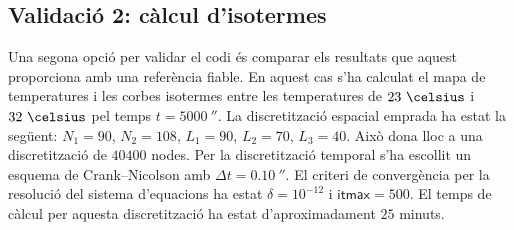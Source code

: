 \clearpage

\subsection{Validació 2: càlcul d'isotermes}

Una segona opció per validar el codi és comparar els resultats que aquest proporciona amb una referència fiable. En aquest cas s'ha calculat el mapa de temperatures i les corbes isotermes entre les temperatures de $23 \ \celsius$ i $32 \ \celsius$ pel temps $t = 5000 \ \second$. La discretització espacial emprada ha estat la següent: $N_1 = 90$, $N_2 = 108$, $L_1 = 90$, $L_2 = 70$, $L_3 = 40$. Això dona lloc a una discretització de $40400$ nodes. Per la discretització temporal s'ha escollit un esquema de Crank--Nicolson amb $\Delta t = 0.10 \ \second$. El criteri de convergència per la resolució del sistema d'equacions ha estat $\delta = 10^{-12}$ i $\textsf{itmax} = 500$. El temps de càlcul per aquesta discretització ha estat d'aproximadament $25$ minuts.


